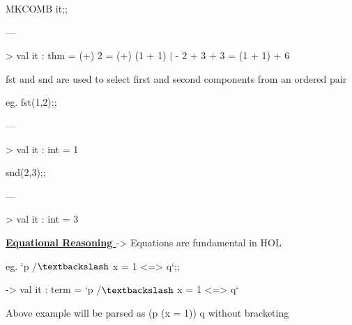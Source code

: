 \documentclass[12pt]{article}
\renewcommand{\_}{\kern-1.5pt\textunderscore\kern-1.5pt}
\begin{document}
{\fontsize{13pt}{15.6pt}\selectfont MK\_COMB it;;\par}\par

{\fontsize{14pt}{16.8pt}\selectfont —{\fontsize{13pt}{15.6pt}\selectfont > val it : thm = (+) 2 = (+) (1 + 1) $ \vert $ - 2 + 3 + 3 = (1 + 1) + 6\par}\par}\par


\vspace{\baselineskip}
{\fontsize{13pt}{15.6pt}\selectfont fst and snd are used to select first and second components from an ordered pair\par}\par

{\fontsize{13pt}{15.6pt}\selectfont eg. fst(1,2);;\par}\par

{\fontsize{14pt}{16.8pt}\selectfont —{\fontsize{13pt}{15.6pt}\selectfont > val it : int = 1\par}\par}\par

{\fontsize{13pt}{15.6pt}\selectfont snd(2,3);;\par}\par

{\fontsize{14pt}{16.8pt}\selectfont —{\fontsize{13pt}{15.6pt}\selectfont > val it : int = 3\par}\par}\par


\vspace{\baselineskip}
{\fontsize{13pt}{15.6pt}\selectfont \textbf{\uline{Equational Reasoning }}-> Equations are fundamental in HOL\par}\par

{\fontsize{13pt}{15.6pt}\selectfont eg. `p /$\textbackslash$  x = 1 <=> q`;;\par}\par

{\fontsize{13pt}{15.6pt}\selectfont -> val it : term = `p /$\textbackslash$  x = 1 <=> q`\par}\par

{\fontsize{13pt}{15.6pt}\selectfont Above example will be parsed as (p (x = 1)) q without bracketing\par}\par
\end{document}
